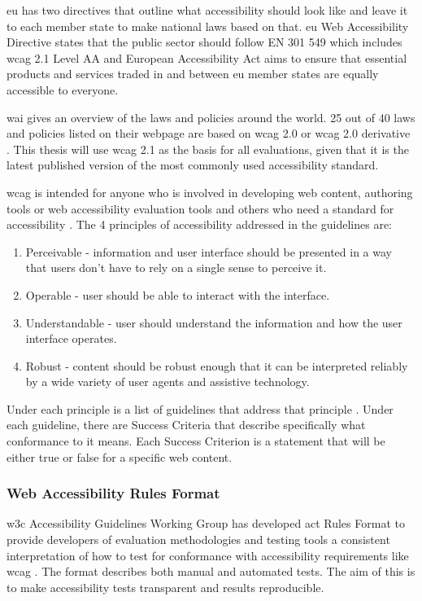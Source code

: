 \documentclass{master_thesis}
\begin{document}
\ac{eu} has two directives that outline what accessibility should look like and leave it to each member state to make national laws based on that. \ac{eu} Web Accessibility Directive states that the public sector should follow EN 301 549 which includes \ac{wcag} 2.1 Level AA and European Accessibility Act aims to ensure that essential products and services traded in and between \ac{eu} member states are equally accessible to everyone.

\ac{wai} gives an overview of the laws and policies around the world. 25 out of 40 laws and policies listed on their webpage are based on \ac{wcag} 2.0 or \ac{wcag} 2.0 derivative \citep{Mueller2018}. This thesis will use \ac{wcag} 2.1 as the basis for all evaluations, given that it is the latest published version of the most commonly used accessibility standard.

\ac{wcag} is intended for anyone who is involved in developing web content, authoring tools or web accessibility evaluation tools and others who need a standard for accessibility \citep{Henry2023}. The 4 principles of accessibility addressed in the guidelines are:
\begin{enumerate}
	\item Perceivable - information and user interface should be presented in a way that users don't have to rely on a single sense to perceive it.
	\item Operable - user should be able to interact with the interface.
	\item Understandable - user should understand the information and how the user interface operates.
	\item Robust - content should be robust enough that it can be interpreted reliably by a wide variety of user agents and assistive technology.
\end{enumerate}
Under each principle is a list of guidelines that address that principle \citep{AGWGWP2022}. Under each guideline, there are Success Criteria that describe specifically what conformance to it means. Each Success Criterion is a statement that will be either true or false for a specific web content.

\subsubsection{Web Accessibility Rules Format}

\ac{w3c} Accessibility Guidelines Working Group has developed \ac{act} Rules Format to provide developers of evaluation methodologies and testing tools a consistent interpretation of how to test for conformance with accessibility requirements like \ac{wcag} \citep{Fiers2019}. The format describes both manual and automated tests. The aim of this is to make accessibility tests transparent and results reproducible.
\end{document}
